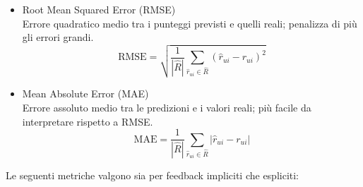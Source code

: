\begin{itemize}
    \item Root Mean Squared Error (RMSE) \\
    Errore quadratico medio tra i punteggi previsti e quelli reali; penalizza di più gli errori grandi.
    \[
    \text{RMSE} = \sqrt{ \frac{1}{|\hat{R}|} \sum_{\hat{r}_{ui} \in \hat{R}} (\hat{r}_{ui} - r_{ui})^2 }
    \]
    
    \item Mean Absolute Error (MAE) \\
    Errore assoluto medio tra le predizioni e i valori reali; più facile da interpretare rispetto a RMSE.
    \[
    \text{MAE} = \frac{1}{|\hat{R}|} \sum_{\hat{r}_{ui} \in \hat{R}} |\hat{r}_{ui} - r_{ui}|
    \]
\end{itemize}   

Le seguenti metriche valgono sia per feedback impliciti che espliciti:

